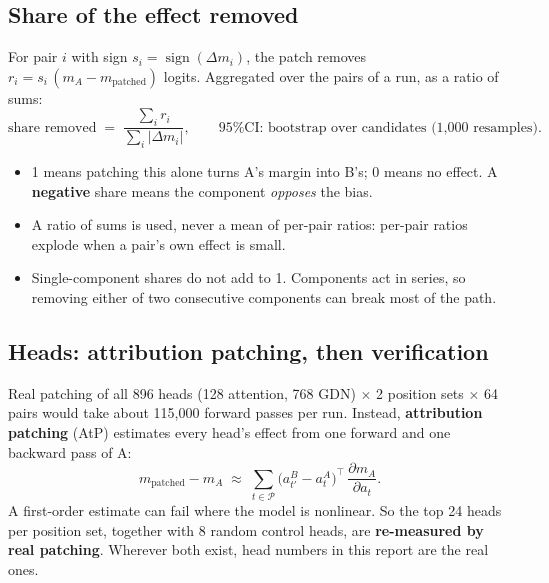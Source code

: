\documentclass[11pt,a4paper]{article}
\newcommand{\dm}{\Delta m}
\begin{document}
\subsection{Share of the effect removed}
For pair $i$ with sign $s_i=\operatorname{sign}(\dm_i)$, the patch removes $r_i = s_i\,(m_A -
m_{\text{patched}})$ logits. Aggregated over the pairs of a run, as a ratio of sums:
\begin{equation}
  \text{share removed} \;=\; \frac{\sum_i r_i}{\sum_i |\dm_i|},
  \qquad
  \text{95\% CI: bootstrap over candidates (1{,}000 resamples).}
\end{equation}
\begin{itemize}
  \item 1 means patching this alone turns A's margin into B's; 0 means no effect. A
        \textbf{negative} share means the component \emph{opposes} the bias.
  \item A ratio of sums is used, never a mean of per-pair ratios: per-pair ratios explode when a
        pair's own effect is small.
  \item Single-component shares do not add to 1. Components act in series, so removing either of
        two consecutive components can break most of the path.
\end{itemize}

\subsection{Heads: attribution patching, then verification}
Real patching of all 896 heads (128 attention, 768 GDN) $\times$ 2 position sets $\times$ 64 pairs
would take about 115{,}000 forward passes per run. Instead, \textbf{attribution patching} (AtP)
estimates every head's effect from one forward and one backward pass of A:
\begin{equation}
  m_{\text{patched}} - m_A \;\approx\; \sum_{t\in\mathcal P}\bigl(a^{B}_{t'} - a^{A}_{t}\bigr)^{\!\top}\,
  \frac{\partial m_A}{\partial a_t}.
\end{equation}
A first-order estimate can fail where the model is nonlinear. So the top 24 heads per position set,
together with 8 random control heads, are \textbf{re-measured by real patching}. Wherever both exist,
head numbers in this report are the real ones.
\end{document}
